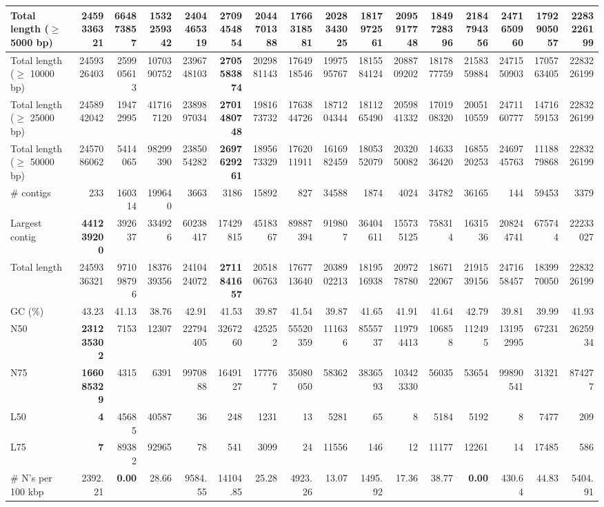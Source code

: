 \documentclass[12pt,a4paper]{article}
\begin{document}
\begin{table}[ht]
\begin{center}
\begin{tabular}{|l*{15}{|r}|}
Total length ($\geq$ 5000 bp) & 2459336321 & 664873857 & 1532259342 & 2404465319 & {\bf 2709454854} & 2044701388 & 1766318581 & 2028343025 & 1817972561 & 2095917748 & 1849728396 & 2184794356 & 2471650960 & 1792905057 & 2283226199 \\ \hline
Total length ($\geq$ 10000 bp) & 2459326403 & 259905613 & 1070390752 & 2396748103 & {\bf 2705583874} & 2029881143 & 1764918546 & 1997595767 & 1815584124 & 2088709202 & 1817877759 & 2158359884 & 2471550903 & 1705763405 & 2283226199 \\ \hline
Total length ($\geq$ 25000 bp) & 2458942042 & 19472995 & 417167120 & 2389897034 & {\bf 2701480748} & 1981673732 & 1763844726 & 1871204344 & 1811265490 & 2059841332 & 1701908320 & 2005110559 & 2471160777 & 1471659153 & 2283226199 \\ \hline
Total length ($\geq$ 50000 bp) & 2457086062 & 5414065 & 98299390 & 2385054282 & {\bf 2697629261} & 1895673329 & 1762011911 & 1616982459 & 1805352079 & 2032050082 & 1463336420 & 1685520253 & 2469745763 & 1118879868 & 2283226199 \\ \hline
\# contigs & 233 & 160314 & 199640 & 3663 & 3186 & 15892 & 827 & 34588 & 1874 & 4024 & 34782 & 36165 & 144 & 59453 & 3379 \\ \hline
Largest contig & {\bf 441239200} & 392637 & 334926 & 60238417 & 17429815 & 4518367 & 89887394 & 919807 & 36404611 & 155735125 & 758314 & 1631536 & 208244741 & 675744 & 22233027 \\ \hline
Total length & 2459336321 & 971098796 & 1837639356 & 2410424072 & {\bf 2711841657} & 2051806763 & 1767713640 & 2038902213 & 1819516938 & 2097278780 & 1867122067 & 2191539156 & 2471658457 & 1839970050 & 2283226199 \\ \hline
GC (\%) & 43.23 & 41.13 & 38.76 & 42.91 & 41.53 & 39.87 & 41.54 & 39.87 & 41.65 & 41.91 & 41.64 & 42.79 & 39.81 & 39.99 & 41.93 \\ \hline
N50 & {\bf 231235302} & 7153 & 12307 & 22794405 & 3267260 & 425252 & 55520359 & 111636 & 8555737 & 119794413 & 106858 & 112495 & 131952995 & 67231 & 2625934 \\ \hline
N75 & {\bf 166085329} & 4315 & 6391 & 9970888 & 1649127 & 177767 & 35080050 & 58362 & 3836593 & 103423330 & 56035 & 53654 & 99890541 & 31321 & 874277 \\ \hline
L50 & {\bf 4} & 45685 & 40587 & 36 & 248 & 1231 & 13 & 5281 & 65 & 8 & 5184 & 5192 & 8 & 7477 & 209 \\ \hline
L75 & {\bf 7} & 89382 & 92965 & 78 & 541 & 3099 & 24 & 11556 & 146 & 12 & 11177 & 12261 & 14 & 17485 & 586 \\ \hline
\# N's per 100 kbp & 2392.21 & {\bf 0.00} & 28.66 & 9584.55 & 14104.85 & 25.28 & 4923.26 & 13.07 & 1495.92 & 17.36 & 38.77 & {\bf 0.00} & 430.64 & 44.83 & 5404.91 \\ \hline
\end{tabular}
\end{center}
\end{table}
\end{document}
